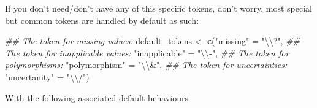 \documentclass[
]{book}
\newenvironment{Shaded}{\begin{snugshade}}{\end{snugshade}}
\newcommand{\CharTok}[1]{\textcolor[rgb]{0.31,0.60,0.02}{#1}}
\newcommand{\CommentTok}[1]{\textcolor[rgb]{0.56,0.35,0.01}{\textit{#1}}}
\newcommand{\ControlFlowTok}[1]{\textcolor[rgb]{0.13,0.29,0.53}{\textbf{#1}}}
\newcommand{\DecValTok}[1]{\textcolor[rgb]{0.00,0.00,0.81}{#1}}
\newcommand{\KeywordTok}[1]{\textcolor[rgb]{0.13,0.29,0.53}{\textbf{#1}}}
\newcommand{\NormalTok}[1]{#1}
\newcommand{\OperatorTok}[1]{\textcolor[rgb]{0.81,0.36,0.00}{\textbf{#1}}}
\newcommand{\StringTok}[1]{\textcolor[rgb]{0.31,0.60,0.02}{#1}}
\begin{document}
\begin{Shaded}
\end{Shaded}

If you don't need/don't have any of this specific tokens, don't worry, most special but common tokens are handled by default as such:

\begin{Shaded}
\begin{Highlighting}[]
\CommentTok{\#\# The token for missing values:}
\NormalTok{default\_tokens \textless{}{-}}\StringTok{ }\KeywordTok{c}\NormalTok{(}\StringTok{"missing"}\NormalTok{      =}\StringTok{ "}\CharTok{\textbackslash{}\textbackslash{}}\StringTok{?"}\NormalTok{,}
\CommentTok{\#\# The token for inapplicable values:                    }
                    \StringTok{"inapplicable"}\NormalTok{ =}\StringTok{ "}\CharTok{\textbackslash{}\textbackslash{}}\StringTok{{-}"}\NormalTok{,}
\CommentTok{\#\# The token for polymorphisms:}
                    \StringTok{"polymorphism"}\NormalTok{ =}\StringTok{ "}\CharTok{\textbackslash{}\textbackslash{}}\StringTok{\&"}\NormalTok{,}
\CommentTok{\#\# The token for uncertainties:}
                    \StringTok{"uncertanity"}\NormalTok{  =}\StringTok{ "}\CharTok{\textbackslash{}\textbackslash{}}\StringTok{/"}\NormalTok{)}
\end{Highlighting}
\end{Shaded}

With the following associated default behaviours
\end{document}
